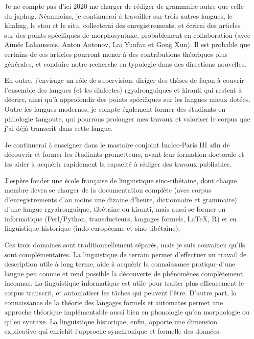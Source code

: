 \documentclass[oldfontcommands,oneside,a4paper,11pt]{article}
\begin{document}
Je ne compte pas d'ici 2020 me charger de rédiger de grammaire autre que celle du japhug. Néanmoins, je continuerai à travailler sur trois autres langues, le khaling, le stau et le situ, collecterai des enregistrements, et écrirai des articles sur des points spécifiques de morphosyntaxe, probablement en collaboration (avec Aimée Lahaussois, Anton Antonov, Lai Yunfan et Gong Xun). Il est probable que certains de ces articles pourront mener à des contributions théoriques plus générales, et conduire notre recherche en typologie dans des directions nouvelles.

En outre, j'envisage un rôle de supervision: diriger des thèses de façon à couvrir l'ensemble des langues (et les dialectes) rgyalronguiques et kiranti qui restent à décrire, ainsi qu'à approfondir des points spécifiques sur les langues mieux dotées. Outre les langues modernes, je compte également former des étudiants en philologie tangoute, qui pourrons prolonger mes travaux et valoriser le corpus que j'ai déjà transcrit dans cette langue. 
 

Je continuerai à enseigner dans le mastaire conjoint Inalco-Paris III afin de découvrir et former les étudiants prometteurs, avant leur formation doctorale et les aider à acquérir rapidement la capacité à rédiger des travaux publiables.

J'espère  fonder une école française de linguistique sino-tibétaine, dont chaque membre devra se charger de la documentation complète (avec corpus d'enregistrements d'au moins une dizaine d'heure, dictionnaire et grammaire) d'une langue rgyalronguique, tibétaine ou  kiranti, mais aussi se former en informatique (Perl/Python, transducteurs, langages formels, \LaTeX, R)  et en linguistique historique (indo-européenne et sino-tibétaine).

Ces trois domaines sont traditionnellement séparés, mais je suis convaincu qu'ils sont complémentaires. La linguistique de terrain permet d'effectuer un travail de description utile à long terme, aide à acquérir la connaissance pratique d'une langue peu connue et rend possible la découverte de phénomènes complètement inconnus. 
 La linguistique informatique est utile pour traiter plus efficacement le corpus transcrit, et automatiser les tâches qui peuvent l'être. D'autre part, la connaissance de la théorie des langages formels et automates permet une approche théorique implémentable  aussi bien en phonologie qu'en morphologie ou qu'en syntaxe.
La linguistique historique, enfin, apporte une dimension explicative qui enrichit l'approche   synchronique et formelle des données.
\end{document}
